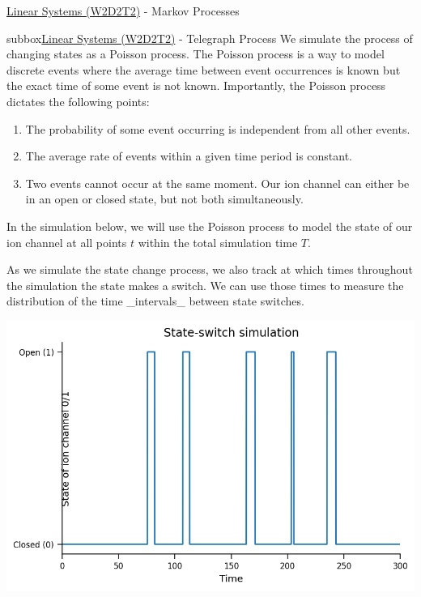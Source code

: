 \begin{textbox}{\href{https://colab.research.google.com/github/NeuromatchAcademy/course-content/blob/master/tutorials/W2D2_LinearSystems/student/W2D2_Tutorial2.ipynb}{Linear Systems (W2D2T2)} -  Markov Processes}
\begin{subbox}{subbox}{\href{https://colab.research.google.com/github/NeuromatchAcademy/course-content/blob/master/tutorials/W2D2_LinearSystems/student/W2D2_Tutorial2.ipynb}{Linear Systems (W2D2T2)}  -  Telegraph Process}
We simulate the process of changing states as a Poisson process. The Poisson process is a way to model discrete events where the average time between event occurrences is known but the exact time of some event is not known. Importantly, the Poisson process dictates the following points: 
\begin{enumerate}
    \item 
The probability of some event occurring is independent from all other events.
    \item 
 The average rate of events within a given time period is constant.
    \item 
 Two events cannot occur at the same moment. Our ion channel can either be in an open or closed state, but not both simultaneously. 
\end{enumerate}

In the simulation below, we will use the Poisson process to model the state of our ion channel at all points $t$ within the total simulation time $T$. 

As we simulate the state change process, we also track at which times throughout the simulation the state makes a switch. We can use those times to measure the distribution of the time _intervals_ between state switches.

\centering
\includegraphics[scale=0.14]{Figures/LS/MC_Figure1.png}

\end{subbox}
\end{textbox}

